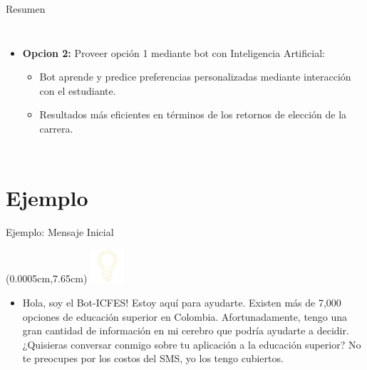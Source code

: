 \documentclass[english,spanish,aspectratio=169,11 pt,utf8]{beamer}	%
\numberwithin{table}{section}
\numberwithin{figure}{section}
\theoremstyle{definition}
\theoremstyle{plain}
\theoremstyle{plain}
\theoremstyle{plain}
\begin{document}
\begin{frame}{Resumen}
\begin{columns}[c]
\begin{itemize}
			\item \textbf{Opcion 2:} Proveer opción 1 mediante bot con Inteligencia Artificial:
					\begin{itemize}
					\item Bot aprende y predice preferencias personalizadas mediante interacción con el estudiante.
					\item Resultados más eficientes en términos de los retornos de elección de la carrera.
					\end{itemize}
		\end{itemize}
	\end{columns}
\end{frame} %

\section{Ejemplo}
\begin{frame}{Ejemplo: Mensaje Inicial} %
	\begin{textblock*}{1.5cm}(0.0005cm,7.65cm) %
		\includegraphics[width=1.25cm]{header_foco.jpg}
	\end{textblock*}
	\begin{itemize}
		\item Hola, soy el Bot-ICFES! Estoy aquí para ayudarte. Existen más de 7,000 opciones de educación superior en Colombia. Afortunadamente, tengo una gran cantidad de información en mi cerebro que podría ayudarte a decidir. ¿Quisieras conversar conmigo sobre tu aplicación a la educación superior? No te preocupes por los costos del SMS, yo los tengo cubiertos.
	\end{itemize}
\end{frame} %
\end{document}

